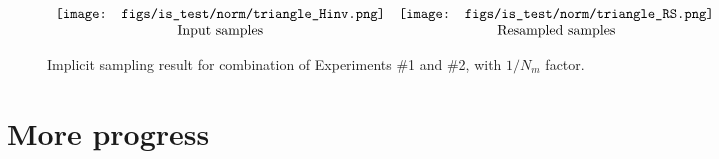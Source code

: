 \documentclass{tufte-handout}
\begin{document}
\begin{figure}
$\begin{array}{c c}
    \texttt{[image: figs/is\_test/norm/triangle\_Hinv.png]}
    & \texttt{[image: figs/is\_test/norm/triangle\_RS.png]}\\
    \text{Input samples} & \text{Resampled samples} \\
\end{array}$
\caption{Implicit sampling result for combination of Experiments \#1 and \#2, with $1/N_m$ factor.}
  \label{fig:is}
\end{figure}

\section{More progress}

\end{document}
